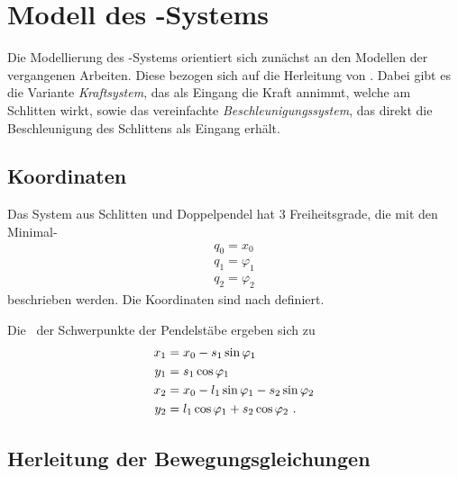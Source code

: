 \section{Modell des \spd-Systems}

Die Modellierung des \spd-Systems orientiert sich zunächst an den Modellen der vergangenen Arbeiten. Diese bezogen sich auf die Herleitung von \cite{modpen}. Dabei gibt es die Variante \emph{Kraftsystem}, das als Eingang die Kraft annimmt, welche am Schlitten wirkt, sowie das vereinfachte \emph{Beschleunigungssystem}, das direkt die Beschleunigung des Schlittens als Eingang erhält.



\begin{figure}[h]
	\centering
		
			\caption{\dpd}
	 \label{fig:koord}
\end{figure}

\subsection{Koordinaten}

Das System aus Schlitten und Doppelpendel hat 3 Freiheitsgrade, die mit den Minimal-\koor 
\begin{align*}
	q_0 = x_0  \\
	q_1 = \varphi_1  \\
	q_2 = \varphi_2
\end{align*}
beschrieben werden. Die Koordinaten sind nach  definiert.

Die \koor\ der Schwerpunkte der Pendelstäbe ergeben sich zu
\begin{align*}
	x_1 &= x_0 - s_1 \sin{\varphi_1}  \\
	y_1 &=       s_1 \cos{\varphi_1}  \\
	x_2 &= x_0 - l_1 \sin{\varphi_1} - s_2 \sin{\varphi_2}  \\
	y_2 &=       l_1 \cos{\varphi_1} + s_2 \cos{\varphi_2}  \ .
\end{align*}


\subsection{Herleitung der Bewegungsgleichungen}

